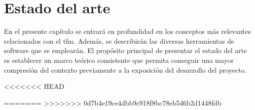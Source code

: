 \chapter{Estado del arte}
\label{estadoArte}

En el presente capítulo se entrará en profundidad en los conceptos más relevantes relacionados con el \gls{tfm}. Además, se describirán las diversas herramientas de software que se emplearán. El propósito principal de presentar el estado del arte es establecer un marco teórico consistente que permita conseguir una mayor compresión del contexto previamente a la exposición del desarrollo del proyecto.

\vspace{3mm}



<<<<<<< HEAD


=======
>>>>>>> 0d7b4e19ce4dbb9c918f8bc78eb546b2d1448fdb







